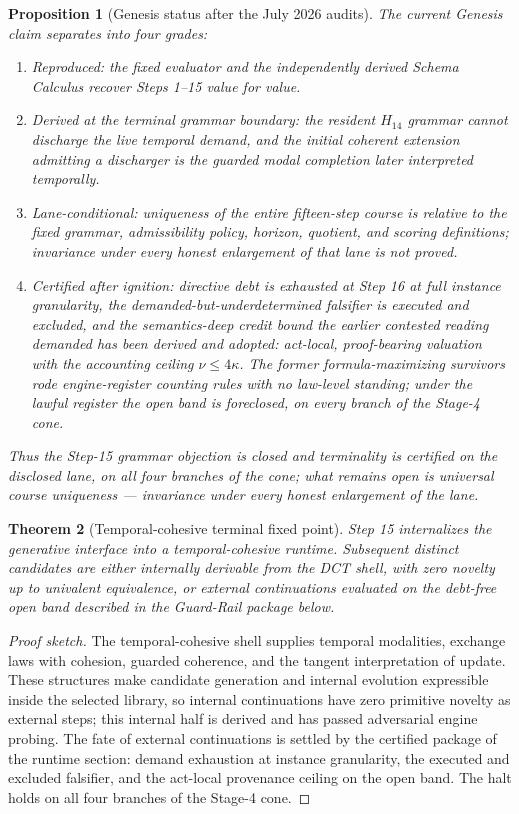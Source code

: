 \documentclass[11pt]{article}
\theoremstyle{plain}
\newtheorem{theorem}{Theorem}[section]
\newtheorem{proposition}[theorem]{Proposition}
\theoremstyle{definition}
\theoremstyle{remark}
\newenvironment{proofsketch}{\begin{proof}[Proof sketch]}{\end{proof}}
\begin{document}
\begin{proposition}[Genesis status after the July 2026 audits]
The current Genesis claim separates into four grades:
\begin{enumerate}[leftmargin=*]
\item \emph{Reproduced:} the fixed evaluator and the independently derived Schema Calculus recover Steps 1--15 value for value.
\item \emph{Derived at the terminal grammar boundary:} the resident \(H_{14}\) grammar cannot discharge the live temporal demand, and the initial coherent extension admitting a discharger is the guarded modal completion later interpreted temporally.
\item \emph{Lane-conditional:} uniqueness of the entire fifteen-step course is relative to the fixed grammar, admissibility policy, horizon, quotient, and scoring definitions; invariance under every honest enlargement of that lane is not proved.
\item \emph{Certified after ignition:} directive debt is exhausted at Step 16 at full instance granularity, the demanded-but-underdetermined falsifier is executed and excluded, and the semantics-deep credit bound the earlier contested reading demanded has been derived and adopted: act-local, proof-bearing valuation with the accounting ceiling \(\nu\le4\kappa\). The former formula-maximizing survivors rode engine-register counting rules with no law-level standing; under the lawful register the open band is foreclosed, on every branch of the Stage-4 cone.
\end{enumerate}
Thus the Step-15 grammar objection is closed and terminality is certified on the disclosed lane, on all four branches of the cone; what remains open is universal course uniqueness --- invariance under every honest enlargement of the lane.
\end{proposition}

\begin{theorem}[Temporal-cohesive terminal fixed point]
Step 15 internalizes the generative interface into a temporal-cohesive runtime. Subsequent distinct candidates are either internally derivable from the DCT shell, with zero novelty up to univalent equivalence, or external continuations evaluated on the debt-free open band described in the Guard-Rail package below.
\end{theorem}

\begin{proofsketch}
The temporal-cohesive shell supplies temporal modalities, exchange laws with cohesion, guarded coherence, and the tangent interpretation of update. These structures make candidate generation and internal evolution expressible inside the selected library, so internal continuations have zero primitive novelty as external steps; this internal half is derived and has passed adversarial engine probing. The fate of external continuations is settled by the certified package of the runtime section: demand exhaustion at instance granularity, the executed and excluded falsifier, and the act-local provenance ceiling on the open band. The halt holds on all four branches of the Stage-4 cone.
\end{proofsketch}
\end{document}
